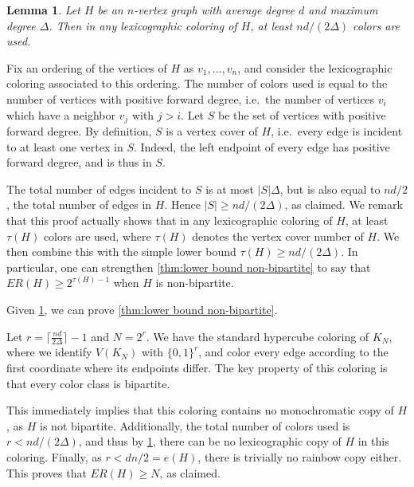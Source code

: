 \documentclass[a4paper,11pt]{article}
\makeatletter
\renewenvironment{proof}[1][\proofname] {\par\pushQED{\qed}\normalfont\topsep6\p@\@plus6\p@\relax\trivlist\item[\hskip\labelsep\bfseries#1\@addpunct{.}]\ignorespaces}{\popQED\endtrivlist\@endpefalse}
\newtheorem{lemma}[theorem]{\bf Lemma}
\theoremstyle{definition}
\newcommand{\ab}[1]{\lvert #1 \rvert}
\makeatother
\begin{document}
\begin{lemma}\label{lem:many color lex}
    Let $H$ be an $n$-vertex graph with average degree $d$ and maximum degree $\Delta$. Then in any lexicographic coloring of $H$, at least $nd/(2\Delta)$ colors are used.
\end{lemma}
\begin{proof}
    Fix an ordering of the vertices of $H$ as $v_1,\dots,v_n$, and consider the lexicographic coloring associated to this ordering. The number of colors used is equal to the number of vertices with positive forward degree, i.e.\ the number of vertices $v_i$ which have a neighbor $v_j$ with $j>i$. Let $S$ be the set of vertices with positive forward degree. By definition, $S$ is a vertex cover of $H$, i.e.\ every edge is incident to at least one vertex in $S$. Indeed, the left endpoint of every edge has positive forward degree, and is thus in $S$.

    The total number of edges incident to $S$ is at most $\ab S \Delta$, but is also equal to $nd/2$, the total number of edges in $H$. Hence $\ab S \geq nd/(2\Delta)$, as claimed.
\end{proof}
We remark that this proof actually shows that in any lexicographic coloring of $H$, at least $\tau(H)$ colors are used, where $\tau(H)$ denotes the vertex cover number of $H$. We then combine this with the simple lower bound $\tau(H) \geq nd/(2\Delta)$. In particular, one can strengthen \cref{thm:lower bound non-bipartite} to say that $ER(H) \geq 2^{\tau(H)-1}$ when $H$ is non-bipartite.

Given \cref{lem:many color lex}, we can prove \cref{thm:lower bound non-bipartite}.

\begin{proof}[Proof of Theorem~\ref{thm:lower bound non-bipartite}.]
    Let $r=\lceil \frac{nd}{2\Delta}\rceil -1$ and $N=2^r$. We have the standard hypercube coloring of $K_N$, where we identify $V(K_N)$ with $\{0,1\}^r$, and color every edge according to the first coordinate where its endpoints differ. The key property of this coloring is that every color class is bipartite.

    This immediately implies that this coloring contains no monochromatic copy of $H$, as $H$ is not bipartite. Additionally, the total number of colors used is $r<nd/(2\Delta)$, and thus by \cref{lem:many color lex}, there can be no lexicographic copy of $H$ in this coloring. 
    Finally, as $r < dn/2 = e(H)$, there is trivially no rainbow copy either.  
    This proves that $ER(H) \geq N$, as claimed.
\end{proof}
\end{document}
